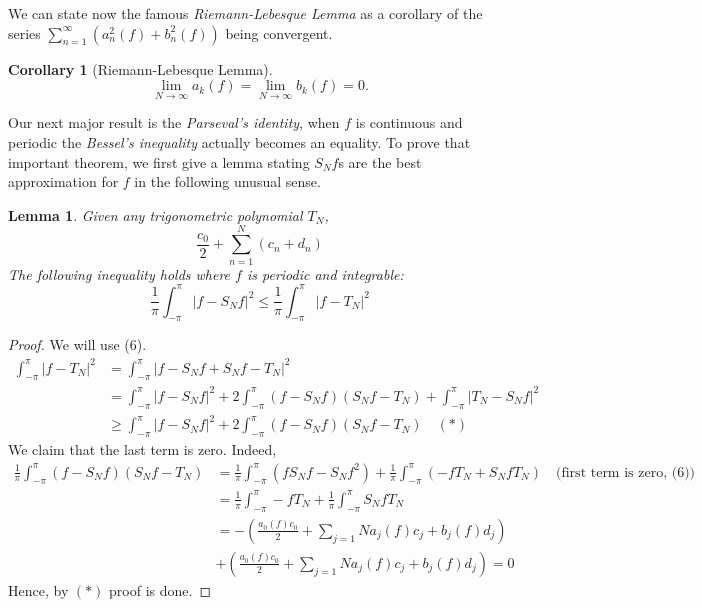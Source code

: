 \documentclass[12pt]{amsart}
\newtheorem{corollary}[theorem]{Corollary}
\newtheorem{lemma}[theorem]{Lemma}
\theoremstyle{definition}
\begin{document}
We can state now the famous \emph{Riemann-Lebesque Lemma} as a corollary of the series $\sum_{n=1}^{\infty} \left(a_n^2(f) + b_n^2(f)\right)$ being convergent.


\begin{corollary}[Riemann-Lebesque Lemma]
    \[
    \lim_{N \to \infty}a_k(f) = \lim_{N \to \infty}b_k(f) = 0.
    \]
\end{corollary}


Our next major result is the \textit{Parseval's identity}, when $f$ is continuous and periodic the \textit{Bessel's inequality} actually becomes an equality. To prove that important theorem, we first give a lemma stating $S_Nf$s are the best approximation for $f$ in the following unusual sense\footnotemark{}.




\begin{lemma}
    Given any trigonometric polynomial $T_N$,
    \[
    \frac{c_0}{2} + \sum_{n=1}^{N} (c_n + d_n)
    \]
    The following inequality holds where $f$ is periodic and integrable:
    \[
    \frac{1}{\pi} \int_{-\pi}^{\pi}\left| f - S_Nf\right|^2 \leq \frac{1}{\pi} \int_{-\pi}^{\pi}\left| f - T_N\right|^2
    \]
\end{lemma}


\begin{proof}
    We will use (6).
    \[
    \begin{aligned}
        \int_{-\pi}^{\pi}\left| f - T_N\right|^2
        &= \int_{-\pi}^{\pi}\left| f - S_Nf + S_Nf - T_N\right|^2\\
        &=  \int_{-\pi}^{\pi} \left| f - S_Nf\right|^2
        + 2 \int_{-\pi}^{\pi}  (f - S_Nf)(S_Nf - T_N)
        + \int_{-\pi}^{\pi} \left| T_N - S_Nf\right|^2 \\
        &\geq \int_{-\pi}^{\pi} \left| f - S_Nf\right|^2
        + 2 \int_{-\pi}^{\pi}  (f - S_Nf)(S_Nf - T_N)  \quad(\ast)
    \end{aligned}
    \]
    We claim that the last term is zero. Indeed,
    \[
    \begin{aligned}
        \frac{1}{\pi}\int_{-\pi}^{\pi}  (f - S_Nf)(S_Nf - T_N)
        &= \frac{1}{\pi} \int_{-\pi}^{\pi}  (fS_Nf - S_Nf^2) + \frac{1}{\pi} \int_{-\pi}^{\pi} (-fT_N + S_NfT_N) \quad \text{(first term is zero, (6))}\\
        &= \frac{1}{\pi} \int_{-\pi}^{\pi} -fT_N + \frac{1}{\pi} \int_{-\pi}^{\pi}  S_NfT_N\\
        &= -\left( \frac{a_0(f)c_0}{2} + \sum_{j=1}{N}a_j(f)c_j + b_j(f)d_j\right) \\
        &+ \left( \frac{a_0(f)c_0}{2} + \sum_{j=1}{N}a_j(f)c_j + b_j(f)d_j\right) = 0
    \end{aligned}
    \]
    Hence, by $(\ast)$ proof is done.
\end{proof}
\end{document}
